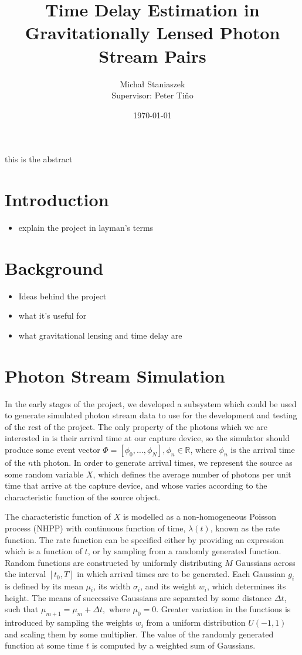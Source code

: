 \documentclass[11pt]{article}
\title{Time Delay Estimation in Gravitationally Lensed Photon Stream Pairs}
\author{\Large{Micha{\l} Staniaszek} \\\small{Supervisor: Peter Ti{\v{n}}o}}
\date{\today}
\begin{document}
\maketitle


this is the abstract

\section{Introduction}
\label{sec-1}

\begin{itemize}
\item explain the project in layman's terms
\end{itemize}
\section{Background}
\label{sec-2}

\begin{itemize}
\item Ideas behind the project
\item what it's useful for
\item what gravitational lensing and time delay are
\end{itemize}
\section{Photon Stream Simulation}
\label{sec-3}

  In the early stages of the project, we developed a subsystem which could be used
  to generate simulated photon stream data to use for the development and testing
  of the rest of the project. The only property of the photons which we are
  interested in is their arrival time at our capture device, so the simulator
  should produce some event vector $\Phi=\left[\phi_0,\dots,\phi_N\right], \phi_n
  \in \mathbb{R}$, where $\phi_n$ is the arrival time of the $n\text{th}$
  photon. In order to generate arrival times, we represent the source as some
  random variable $X$, which defines the average number of photons per unit time
  that arrive at the capture device, and whose varies according to the
  characteristic function of the source object.

  The characteristic function of $X$ is modelled as a non-homogeneous Poisson
  process (NHPP) with continuous function of time, $\lambda(t)$, known as the rate
  function. The rate function can be specified either by providing an expression
  which is a function of $t$, or by sampling from a randomly generated
  function. Random functions are constructed by uniformly distributing $M$
  Gaussians across the interval $\left[t_0,T\right]$ in which arrival times are to
  be generated. Each Gaussian $g_i$ is defined by its mean $\mu$$_i$, its width
  $\sigma$$_i$, and its weight $w_i$, which determines its height. The means of
  successive Gaussians are separated by some distance $\Delta t$, such that
  $\mu_{m+1}=\mu_m + \Delta t,\text{ where } \mu_0=0$. Greater variation in the
  functions is introduced by sampling the weights $w_i$ from a uniform
  distribution $U(-1,1)$ and scaling them by some multiplier. The value of the
  randomly generated function at some time $t$ is computed by a weighted sum of
  Gaussians.
\end{document}
